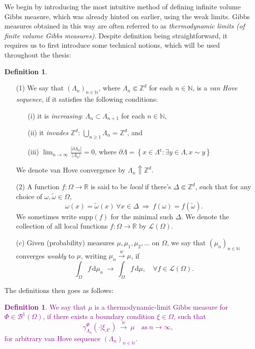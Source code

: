 \documentclass[12pt]{article}
\newcommand{\BB}{\mathscr{B}}
\renewcommand{\d}{\mathrm{d}}
\newcommand{\Loc}{\mathcal{L}}
\newcommand{\N}{\mathbb{N}}
\newcommand{\R}{\mathbb{R}}
\newcommand{\Z}{\mathbb{Z}}
\newcommand{\set}[1]{\left\{#1\right\}}
\newcommand{\ra}{\rightarrow}
\newcommand{\pika}{\boldsymbol{\cdot}}
\newcommand{\1}{\mathbbm{1}}
\renewcommand{\c}{\mathsf{c}}
\newcommand{\supp}{\mathrm{supp}}
\newcommand{\5}{\vspace{0.5cm}}
\renewcommand{\tilde}{\widetilde}
\theoremstyle{definition}
\newtheorem{df}[thm]{Definition}
\begin{document}
We begin by introducing the most intuitive method of defining infinite volume Gibbs measure, which was already hinted on earlier, using the weak limits. Gibbs measures obtained in this way are often referred to as \textit{thermodynamic limits (of finite volume Gibbs measures)}. Despite definition being straightforward, it requires us to first introduce some technical notions, which will be used throughout the thesis:

\begin{df}
~
\begin{itemize}
	\item[(1)] We say that $(\Lambda_n)_{n\in\N}$, where $\Lambda_n\Subset\Z^d$ for each $n\in\N$, is a \textit{van Hove sequence}, if it satisfies the following conditions:
	\begin{itemize}
		\item[(i)] it is \textit{increasing}: $\Lambda_n\subset\Lambda_{n+1}$ for each $n\in\N$,
		\item[(ii)] it \textit{invades} $\Z^d$: $\bigcup_{n\geq 1}\Lambda_n=\Z^d$, and
		\item[(iii)] $\lim_{n\ra\infty}\frac{|\partial\Lambda_n|}{|\Lambda_n|}=0$, where $\partial \Lambda=\set{x\in\Lambda^\c:\exists y\in\Lambda,x\sim y}$
	\end{itemize}
	We denote van Hove convergence by $\Lambda_n\Uparrow\Z^d$.
	\item[(2)] A function $f:\Omega\ra\R$ is said to be \textit{local} if there's $\Delta\Subset\Z^d$, such that for any choice of $\omega,\tilde{\omega}\in\Omega$, 
	$$\omega(x)=\tilde{\omega}(x)~\forall x\in\Delta ~\Longrightarrow~ f(\omega)=f(\tilde{\omega}).$$
	We sometimes write $\supp(f)$ for the minimal such $\Delta$. We denote the collection of all local functions $f:\Omega\ra\R$ by $\Loc(\Omega)$.
	\item[(c)] Given (probability) measures $\mu,\mu_1,\mu_2,\ldots$ on $\Omega$, we say that $(\mu_n)_{n\in\N}$ converges \textit{weakly} to $\mu$, writing $\mu_n\xrightarrow{w}\mu$, if
	$$\int_\Omega f\,\d\mu_n ~\ra~ \int_\Omega f\,\d\mu, \quad \forall f\in\Loc(\Omega).$$
\end{itemize}
\end{df}

The definitions then goes as follows:
\textcolor{purple}{
\begin{df}
We say that $\mu$ is a thermodynamic-limit Gibbs measure for $\Phi\in\BB^1(\Omega)$, if there exists a boundary condition $\xi\in\Omega$, such that
$$\gamma_{\Lambda_n}^\Phi(\pika|\xi_{\Lambda^\c}) ~\xrightarrow{w}~ \mu \quad \text{as}~n\ra\infty,$$
for arbitrary van Hove sequence $(\Lambda_n)_{n\in\N}$.
\end{df}
}
\end{document}
